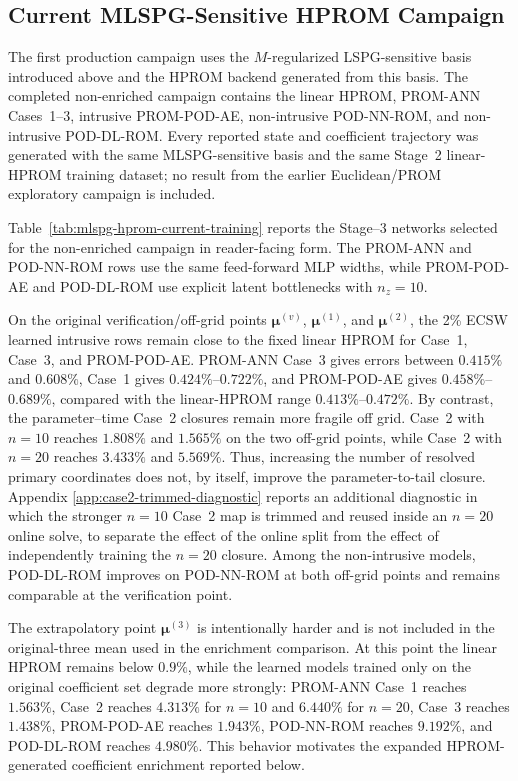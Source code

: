 \documentclass[11pt]{article}
\begin{document}
\subsection{Current MLSPG-Sensitive HPROM Campaign}

The first production campaign uses the $M$-regularized LSPG-sensitive basis
introduced above and the HPROM backend generated from this basis.  The
completed non-enriched campaign contains the linear HPROM, PROM-ANN
Cases~1--3, intrusive PROM-POD-AE, non-intrusive POD-NN-ROM, and non-intrusive
POD-DL-ROM.  Every reported state and coefficient trajectory was generated
with the same MLSPG-sensitive basis and the same Stage~2 linear-HPROM training
dataset; no result from the earlier Euclidean/PROM exploratory campaign is
included.

Table~\ref{tab:mlspg-hprom-current-training} reports the Stage--3 networks
selected for the non-enriched campaign in reader-facing form.  The PROM-ANN
and POD-NN-ROM rows use the same feed-forward MLP widths, while PROM-POD-AE
and POD-DL-ROM use explicit latent bottlenecks with $n_z=10$.





On the original verification/off-grid points
$\bm\mu^{(v)}$, $\bm\mu^{(1)}$, and $\bm\mu^{(2)}$, the 2\% ECSW learned
intrusive rows remain close to the fixed linear HPROM for Case~1, Case~3, and
PROM-POD-AE.  PROM-ANN Case~3 gives errors between $0.415\%$ and $0.608\%$,
Case~1 gives $0.424\%$--$0.722\%$, and PROM-POD-AE gives
$0.458\%$--$0.689\%$, compared with the linear-HPROM range
$0.413\%$--$0.472\%$.  By contrast, the parameter--time Case~2 closures remain
more fragile off grid.  Case~2 with $n=10$ reaches $1.808\%$ and $1.565\%$ on
the two off-grid points, while Case~2 with $n=20$ reaches $3.433\%$ and
$5.569\%$.  Thus, increasing the number of resolved primary coordinates does
not, by itself, improve the parameter-to-tail closure.  Appendix
\ref{app:case2-trimmed-diagnostic} reports an additional diagnostic in which
the stronger $n=10$ Case~2 map is trimmed and reused inside an $n=20$ online
solve, to separate the effect of the online split from the effect of
independently training the $n=20$ closure.  Among the non-intrusive models,
POD-DL-ROM improves on POD-NN-ROM at both off-grid points and remains
comparable at the verification point.

The extrapolatory point $\bm\mu^{(3)}$ is intentionally harder and is not
included in the original-three mean used in the enrichment comparison.  At
this point the linear HPROM remains below $0.9\%$, while the learned models
trained only on the original coefficient set degrade more strongly:
PROM-ANN Case~1 reaches $1.563\%$, Case~2 reaches $4.313\%$ for $n=10$ and
$6.440\%$ for $n=20$, Case~3 reaches $1.438\%$, PROM-POD-AE reaches
$1.943\%$, POD-NN-ROM reaches $9.192\%$, and POD-DL-ROM reaches $4.980\%$.
This behavior motivates the expanded
HPROM-generated coefficient enrichment reported below.
\end{document}
